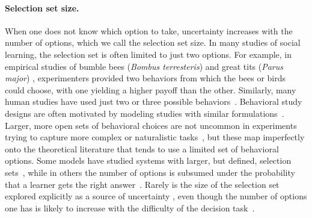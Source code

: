\documentclass[letterpaper,11.5pt]{scrartcl}
\newcommand{\mt}[1]{{\textcolor{myorange} {({\tiny MT:} #1)}}}
\newcommand{\cm}[1]{{\textcolor{mypurple} {({\tiny CM:} #1)}}}
\begin{document}
\paragraph{Selection set size.}
When one does not know which option to take, uncertainty increases with the number of options, which we call the selection set size.
In many studies of social learning, the selection set is often limited to just two options.  For example, in empirical studies of bumble bees (\emph{Bombus
terresteris}) \citep{Baracchi2018} and great tits (\emph{Parus major}) \citep{Aplin2017}, experimenters provided two behaviors from which the bees or birds
could choose, with one yielding a higher payoff than the other. %
Similarly, many human studies have used just two or three possible
behaviors~\citep{McElreath2005,Morgan2012, Toyokawa2019}. Behavioral study designs are
often motivated by modeling studies with similar formulations~\citep{Rogers1988,boyd1995does,Feldman1996,
perreault2012bayesian}.
Larger, more open sets of behavioral choices are not uncommon in experiments trying to capture more complex or naturalistic tasks~\citep{derex2013, wasielewski2014}, but these map imperfectly onto the theoretical literature that tends to use a limited set of behavioral options.
Some models have studied systems with larger, but defined, selection sets~\citep{Rendell2010, lindstrom2016co}, while in others the number of options is subsumed under the probability that a learner gets the right  answer~\citep{Feldman1996,Enquist2007}.
Rarely is the size of the selection set explored explicitly as a source of  uncertainty \citep[though see][]{Muthukrishna2016a}, even though the number of options one has is likely to increase with the difficulty of the decision task~\citep{haynes2009testing,white2009testing}.  
\end{document}

